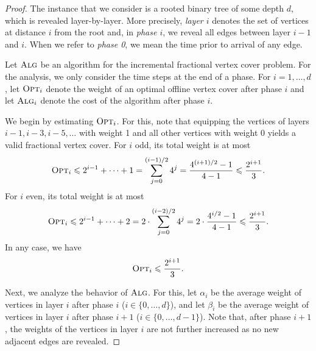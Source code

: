 \documentclass[a4paper,USenglish,cleveref,autoref,thm-restate,pdfa]{lipics-v2021}
\let\leq\leqslant
\newcommand{\alg}{\textsc{Alg}\xspace}
\newcommand{\opt}{\textsc{Opt}\xspace}
\begin{document}
\begin{proof}
The instance that we consider is a rooted binary tree of some depth $d$, which is revealed layer-by-layer.
More precisely, \emph{layer $i$} denotes the set of vertices at distance $i$ from the root and, in \emph{phase $i$}, we reveal all edges between layer $i-1$ and $i$. When we refer to \emph{phase 0}, we mean the time prior to arrival of any edge.

Let $\alg$ be an algorithm for the incremental fractional vertex cover problem. 
For the analysis, we only consider the time steps at the end of a phase.
For $i=1, \dots, d$, let $\opt_i$ denote the weight of an optimal offline vertex cover after phase $i$ and let $\alg_i$ denote the cost of the algorithm after phase $i$.

We begin by estimating $\opt_i$. For this, note that equipping the vertices of layers $i-1, i-3, i-5, \dots$ with weight 1 and all other vertices with weight 0 yields a valid fractional vertex cover. For $i$ odd, its total weight is at most
\begin{equation*}
\opt_i \leq 2^{i-1} + \dots + 1 = \sum\limits_{j=0}^{(i-1)/2} 4^j = \frac{4^{(i+1)/2}-1}{4-1} \leq \frac{2^{i+1}}{3}.
\end{equation*}
For $i$ even, its total weight is at most
\begin{equation*}
\opt_i \leq 2^{i-1} + \dots + 2
= 2 \cdot  \sum\limits_{j=0}^{(i-2)/2} 4^j = 2 \cdot \frac{4^{i/2}-1}{4-1} \leq \frac{2^{i+1}}{3}.
\end{equation*}
In any case, we have
\begin{equation}\label{eq:opt}
\opt_i\leq \frac{2^{i+1}}{3}.
\end{equation}

Next, we analyze the behavior of $\alg$. For this, let $\alpha_i$ be the average weight of vertices in layer $i$ after phase $i$ ($i\in \{0, \dots, d\}$), and let $\beta_i$ be the average weight of vertices in layer $i$ after phase $i+1$ ($i\in \{0, \dots, d-1\}$). Note that, after phase $i+1$, the weights of the vertices in layer $i$ are not further increased as no new adjacent edges are revealed.


\end{proof}
\end{document}
